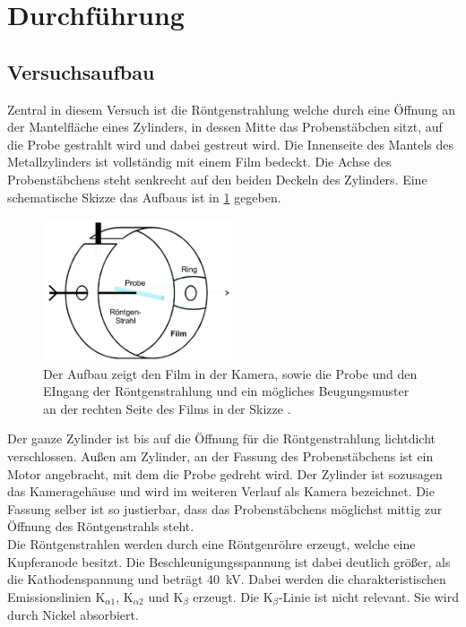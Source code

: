 \section{Durchführung}
\label{sec:Durchführung}
\subsection{Versuchsaufbau}
Zentral in diesem Versuch ist die Röntgenstrahlung welche durch eine Öffnung an der Mantelfläche eines Zylinders, in dessen Mitte das Probenstäbchen sitzt, auf die Probe gestrahlt wird und dabei gestreut wird. 
Die Innenseite des Mantels des Metallzylinders ist vollständig mit einem Film bedeckt.
Die Achse des Probenstäbchens steht senkrecht auf den beiden Deckeln des Zylinders. Eine schematische Skizze das Aufbaus ist in \ref{fig:Aufbau} gegeben.
\begin{figure}
	\centering
	\includegraphics[width = 0.5\textwidth]{Abbildungen/Aufbau.png}
	\caption{Der Aufbau zeigt den Film in der Kamera, sowie die Probe und den EIngang der Röntgenstrahlung und ein mögliches Beugungsmuster an der rechten Seite des Films in der Skizze \cite{Anleitung}. }
	\label{fig:Aufbau}
\end{figure}  
Der ganze Zylinder ist bis auf die Öffnung für die Röntgenstrahlung lichtdicht verschlossen.
Außen am Zylinder, an der Fassung des Probenstäbchens ist ein Motor angebracht, mit dem die Probe gedreht wird.
Der Zylinder ist sozusagen das Kameragehäuse und wird im weiteren Verlauf als Kamera bezeichnet. 
Die Fassung selber ist so justierbar, dass das Probenstäbchens möglichst mittig zur Öffnung des Röntgenstrahls steht.\\
Die Röntgenstrahlen werden durch eine Röntgenröhre erzeugt, welche eine Kupferanode besitzt.
Die Beschleunigungsspannung ist dabei deutlich größer, als die Kathodenspannung und beträgt \SI{40}{\kV}. 
Dabei werden die charakteristischen Emissionslinien K$_{\alpha 1}$, K$_{\alpha 2}$ und K$_\beta$ erzeugt. 
Die K$_\beta$-Linie ist nicht relevant.  
Sie wird durch Nickel absorbiert.

